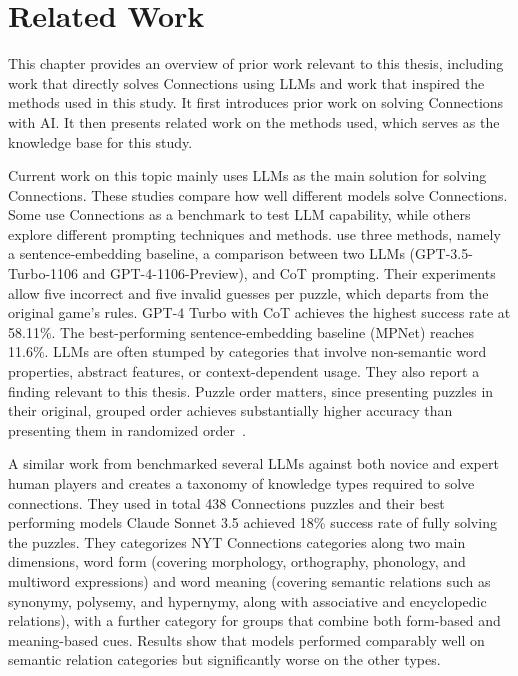 \chapter{Related Work}
\label{ch:related_work}

This chapter provides an overview of prior work relevant to this thesis, including work that directly solves Connections using LLMs and work that inspired the methods used in this study. It first introduces prior work on solving Connections with AI. It then presents related work on the methods used, which serves as the knowledge base for this study.

\label{sec:prior-work-connections}

Current work on this topic mainly uses LLMs as the main solution for solving Connections. These studies compare how well different models solve Connections. Some use Connections as a benchmark to test LLM capability, while others explore different prompting techniques and methods. \citeauthor{toddMissedConnectionsLateral2024} use three methods, namely a sentence-embedding baseline, a comparison between two LLMs (GPT-3.5-Turbo-1106 and GPT-4-1106-Preview), and \ac{CoT} prompting. Their experiments allow five incorrect and five invalid guesses per puzzle, which departs from the original game's rules. GPT-4 Turbo with \ac{CoT} achieves the highest success rate at 58.11\%. The best-performing sentence-embedding baseline (MPNet) reaches 11.6\%. LLMs are often stumped by categories that involve non-semantic word properties, abstract features, or context-dependent usage. They also report a finding relevant to this thesis. Puzzle order matters, since presenting puzzles in their original, grouped order achieves substantially higher accuracy than presenting them in randomized order~\cite{toddMissedConnectionsLateral2024}.

A similar work from \citeauthor{samadarshiConnectingDotsEvaluating2024} benchmarked several LLMs against both novice and expert human players and creates a taxonomy of knowledge types required to solve connections. They used in total 438 Connections puzzles and their best performing models Claude Sonnet 3.5 achieved 18\% success rate of fully solving the puzzles. They categorizes NYT Connections categories along two main dimensions, word form (covering morphology, orthography, phonology, and multiword expressions) and word meaning (covering semantic relations such as synonymy, polysemy, and hypernymy, along with associative and encyclopedic relations), with a further category for groups that combine both form-based and meaning-based cues. Results show that models performed comparably well on semantic relation categories but significantly worse on the other types.

